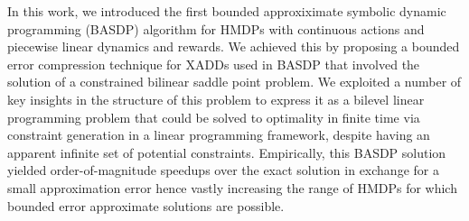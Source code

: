 
In this work, we introduced the first bounded approxiximate symbolic
dynamic programming (BASDP) algorithm for HMDPs with continuous
actions and piecewise linear dynamics and rewards.  We achieved this
by proposing a bounded error compression technique for XADDs used in
BASDP that involved the solution of a constrained bilinear saddle
point problem.  We exploited a number of key insights in the structure
of this problem to express it as a bilevel linear programming problem
that could be solved to optimality in finite time via constraint
generation in a linear programming framework, despite having an
apparent infinite set of potential constraints.  Empirically, this
BASDP solution yielded order-of-magnitude speedups over the exact
solution in exchange for a small approximation error hence vastly
increasing the range of HMDPs for which bounded error approximate
solutions are possible.
